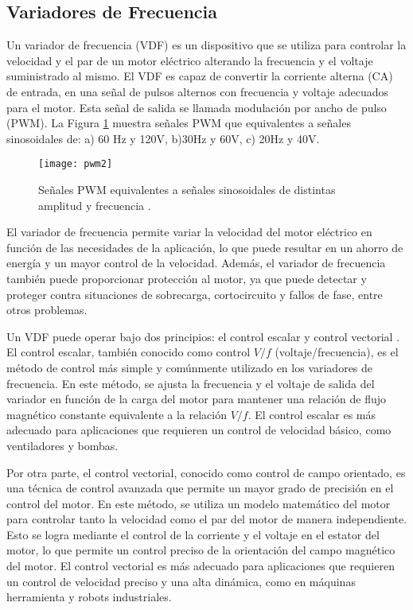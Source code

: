 \subsection{Variadores de Frecuencia}

Un variador de frecuencia (VDF) es un dispositivo que se utiliza para controlar la velocidad y el par de un motor eléctrico alterando la frecuencia y el voltaje suministrado al mismo. El VDF es capaz de convertir la corriente alterna (CA) de entrada, en una señal de pulsos alternos con frecuencia y voltaje adecuados para el motor. Esta señal de salida se llamada modulación por ancho de pulso (PWM). La Figura \ref{fig:pwm} muestra señales PWM que equivalentes a señales sinosoidales de: a) 60 Hz y 120V, b)30Hz y 60V, c) 20Hz y 40V.

\begin{figure}
	\centering
	\texttt{[image: pwm2]}
	\caption{Señales PWM equivalentes a señales sinosoidales de distintas amplitud y frecuencia \cite{Chapman12}.}
	\label{fig:pwm}
\end{figure}


El variador de frecuencia permite variar la velocidad del motor eléctrico en función de las necesidades de la aplicación, lo que puede resultar en un ahorro de energía y un mayor control de la velocidad. Además, el variador de frecuencia también puede proporcionar protección al motor, ya que puede detectar y proteger contra situaciones de sobrecarga, cortocircuito y fallos de fase, entre otros problemas.

Un VDF puede operar bajo dos principios: el control escalar y control vectorial \cite{Posadas05}. El control escalar, también conocido como control $V/f$ (voltaje/frecuencia), es el método de control más simple y comúnmente utilizado en los variadores de frecuencia. En este método, se ajusta la frecuencia y el voltaje de salida del variador en función de la carga del motor para mantener una relación de flujo magnético constante equivalente a la relación $V/f$. El control escalar es más adecuado para aplicaciones que requieren un control de velocidad básico, como ventiladores y bombas. 

Por otra parte, el control vectorial, conocido como control de campo orientado, es una técnica de control avanzada que permite un mayor grado de precisión en el control del motor. En este método, se utiliza un modelo matemático del motor para controlar tanto la velocidad como el par del motor de manera independiente. Esto se logra mediante el control de la corriente y el voltaje en el estator del motor, lo que permite un control preciso de la orientación del campo magnético del motor. El control vectorial es más adecuado para aplicaciones que requieren un control de velocidad preciso y una alta dinámica, como en máquinas herramienta y robots industriales.

